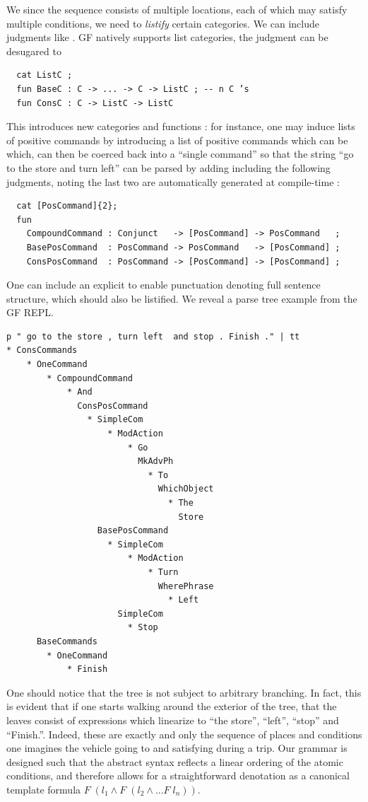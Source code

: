 \documentclass[a4paper, 11pt]{article}
\begin{document}
We since the sequence consists of multiple locations, each of which may satisfy multiple
conditions, we need to \emph{listify} certain categories. We can include 
judgments like .
GF natively supports list categories, the judgment  can be
desugared to

\begin{verbatim}
  cat ListC ;
  fun BaseC : C -> ... -> C -> ListC ; -- n C ’s
  fun ConsC : C -> ListC -> ListC
\end{verbatim}

This introduces new categories and functions : for instance, one may induce
lists of positive commands by introducing a list of positive commands which can
be which, can then be coerced back into a ``single command'' so that the string
``go to the store and turn left'' can be parsed by adding including the
following judgments, noting the last two are automatically generated at compile-time :

\begin{verbatim}
  cat [PosCommand]{2}; 
  fun 
    CompoundCommand : Conjunct   -> [PosCommand] -> PosCommand   ;
    BasePosCommand  : PosCommand -> PosCommand   -> [PosCommand] ;
    ConsPosCommand  : PosCommand -> [PosCommand] -> [PosCommand] ;
\end{verbatim}
 
One can include an explicit  to enable punctuation denoting
full sentence structure, which should also be listified. We reveal a parse tree
example from the GF REPL.

\begin{verbatim}
p " go to the store , turn left  and stop . Finish ." | tt
* ConsCommands
    * OneCommand
        * CompoundCommand
            * And
              ConsPosCommand
                * SimpleCom
                    * ModAction
                        * Go
                          MkAdvPh
                            * To
                              WhichObject
                                * The
                                  Store
                  BasePosCommand
                    * SimpleCom
                        * ModAction
                            * Turn
                              WherePhrase
                                * Left
                      SimpleCom
                        * Stop
      BaseCommands
        * OneCommand
            * Finish
\end{verbatim}

One should notice that the tree is not subject to arbitrary branching. In fact,
this is evident that if one starts walking around the exterior of the tree, that
the leaves consist of expressions which linearize to ``the store'', ``left'',
``stop'' and ``Finish.''. Indeed, these are exactly and only the sequence of
places and conditions one imagines the vehicle going to and satisfying during 
a trip. Our grammar is designed such that the abstract syntax reflects a linear
ordering of the atomic conditions, and therefore allows for a straightforward
denotation as a canonical template formula $F\; (l_1 \wedge F\; (l_{2} \wedge ... F\; l_{n}))$.
\end{document}
